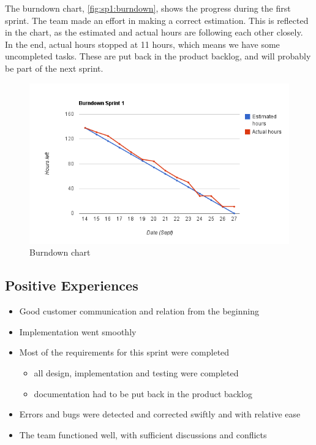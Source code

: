 The burndown chart, \autoref{fig:sp1:burndown}, shows the progress during
the first sprint. The team made an effort in making a correct estimation. This
is reflected in the chart, as the estimated and actual hours are  following
each other closely. In the end, actual hours stopped at 11 hours, which means we
have some uncompleted tasks. These are put back in the product backlog, and will
probably be part of the next sprint. 

\begin{figure}[!htb]
	\includegraphics[width=\textwidth]{./sprints/img/burndown_chart_s1}
	\caption{Burndown chart\label{fig:sp1:burndown}}
\end{figure}

\subsection{Positive Experiences}
\begin{itemize}
	\item Good customer communication and relation from the beginning
	\item Implementation went smoothly
	\item Most of the requirements for this sprint were completed
	\begin{itemize} 
		\item all design, implementation and testing were completed
		\item documentation had to be put back in the product backlog 
	\end{itemize}
	\item Errors and bugs were detected and corrected swiftly and with relative ease
	\item The team functioned well, with sufficient discussions and conflicts
\end{itemize}

